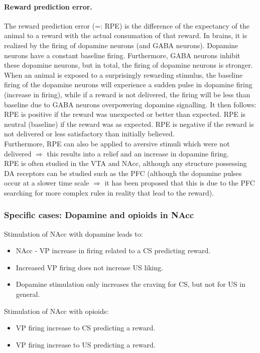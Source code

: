 \documentclass[twosided, a4paper, pt11]{article}
\begin{document}
	\paragraph{Reward prediction error.} The reward prediction error (=: RPE) is the difference of the expectancy of the animal to a reward with the actual consumation of that reward. In brains, it is realized by the firing of dopamine neurons (and GABA neurons). Dopamine neurons have a constant baseline firing. Furthermore, GABA neurons inhibit these dopamine neurons, but in total, the firing of dopamine neurons is stronger. When an animal is exposed to a surprisingly rewarding stimulus, the baseline firing of the dopamine neurons will experience a sudden pulse in dopamine firing (increase in firing), while if a reward is not delivered, the firing will be less than baseline due to GABA neurons overpowering dopamine signalling. It then follows: RPE is positive if the reward was unexpected or better than expected. RPE is neutral (baseline) if the reward was as expected. RPE is negative if the reward is not delivered or less satisfactory than initially believed.\\
	Furthermore, RPE can also be applied to aversive stimuli which were not delivered $\Rightarrow$ this results into a relief and an increase in dopamine firing.\\
	
	RPE is often studied in the VTA and NAcc, although any structure possessing DA receptors can be studied such as the PFC (although the dopamine pulses occur at a slower time scale $\Rightarrow$ it has been proposed that this is due to the PFC searching for more complex rules in reality that lead to the reward).
	
	\subsubsection{Specific cases: Dopamine and opioids in NAcc}
	Stimulation of NAcc with dopamine leads to:
	\begin{itemize}
	\item NAcc - VP increase in firing related to a CS predicting reward.
	\item Increased VP firing does not increase US liking.
	\item Dopamine stimulation only increases the craving for CS, but not for US in general.
	\end{itemize}

	Stimulation of NAcc with opioids:
	\begin{itemize}
	\item VP firing increase to CS predicting a reward.
	\item VP firing increase to US predicting a reward.
	\end{itemize}
	
\end{document}

